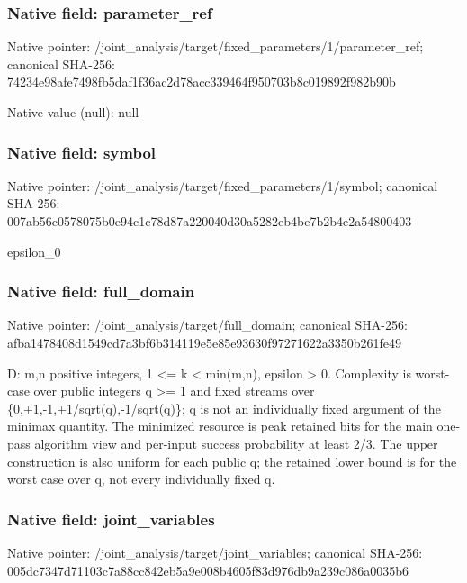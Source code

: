 \documentclass[10pt,a4paper]{article}
\begin{document}
\subsubsection{Native field: parameter\_\allowbreak{}ref}
Native pointer: /joint\_\allowbreak{}analysis/target/fixed\_\allowbreak{}parameters/1/parameter\_\allowbreak{}ref; canonical SHA-256: 74234e98afe7498fb5daf1f36ac2d78acc339464f950703b8c019892f982b90b

Native value (null): null

\subsubsection{Native field: symbol}
Native pointer: /joint\_\allowbreak{}analysis/target/fixed\_\allowbreak{}parameters/1/symbol; canonical SHA-256: 007ab56c0578075b0e94c1c78d87a220040d30a5282eb4be7b2b4e2a54800403

\begingroup\raggedright\sloppy epsilon\_\allowbreak{}0\par\endgroup

\subsubsection{Native field: full\_\allowbreak{}domain}
Native pointer: /joint\_\allowbreak{}analysis/target/full\_\allowbreak{}domain; canonical SHA-256: afba1478408d1549cd7a3bf6b314119e5e85e93630f97271622a3350b261fe49

\begingroup\raggedright\sloppy D:\allowbreak{} m,\allowbreak{}n positive integers,\allowbreak{} 1 <=\allowbreak{} k < min(m,\allowbreak{}n),\allowbreak{} epsilon > 0. Complexity is worst-case over public integers q >=\allowbreak{} 1 and fixed streams over \{0,\allowbreak{}+1,\allowbreak{}-1,\allowbreak{}+1/\allowbreak{}sqrt(q),\allowbreak{}-1/\allowbreak{}sqrt(q)\};\allowbreak{} q is not an individually fixed argument of the minimax quantity. The minimized resource is peak retained bits for the main one-pass algorithm view and per-input success probability at least 2/\allowbreak{}3. The upper construction is also uniform for each public q;\allowbreak{} the retained lower bound is for the worst case over q,\allowbreak{} not every individually fixed q.\par\endgroup

\subsubsection{Native field: joint\_\allowbreak{}variables}
Native pointer: /joint\_\allowbreak{}analysis/target/joint\_\allowbreak{}variables; canonical SHA-256: 005dc7347d71103c7a88cc842eb5a9e008b4605f83d976db9a239c086a0035b6
\end{document}
